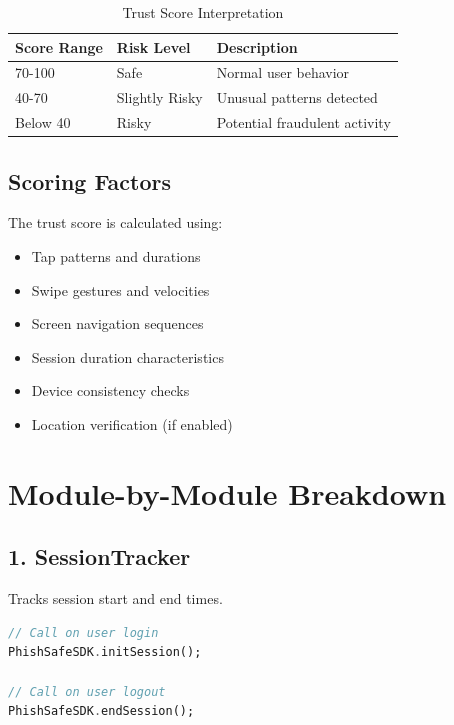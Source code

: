 \documentclass[11pt]{article}
\begin{document}
\begin{table}[H]
    \centering
    \begin{tabular}{|l|l|l|}
        \hline
        \textbf{Score Range} & \textbf{Risk Level} & \textbf{Description} \\
        \hline
        70-100 & Safe & Normal user behavior \\
        \hline
        40-70 & Slightly Risky & Unusual patterns detected \\
        \hline
        Below 40 & Risky & Potential fraudulent activity \\
        \hline
    \end{tabular}
    \caption{Trust Score Interpretation}
\end{table}

\subsection{Scoring Factors}
The trust score is calculated using:

\begin{itemize}
    \item Tap patterns and durations
    \item Swipe gestures and velocities
    \item Screen navigation sequences
    \item Session duration characteristics
    \item Device consistency checks
    \item Location verification (if enabled)
\end{itemize}

\clearpage
\section{Module-by-Module Breakdown}

\subsection{1. SessionTracker}
Tracks session start and end times.

\begin{lstlisting}[language=Dart]
// Call on user login
PhishSafeSDK.initSession();

// Call on user logout  
PhishSafeSDK.endSession();
\end{lstlisting}
\end{document}
